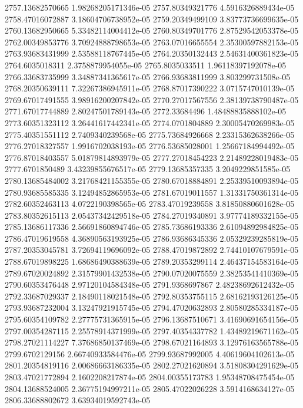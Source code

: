 {2757.13682570665 1.98268205171346e-05
2757.80349321776 4.5916326889434e-05
2758.47016072887 3.18604706738952e-05
2759.20349499109 3.83773736699635e-05
2760.13682950665 5.33482114004412e-05
2760.80349701776 2.87529542053378e-05
2762.00349853776 3.70924888798653e-05
2763.07016655554 2.35300597882153e-05
2763.93683431999 2.53588118767445e-05
2764.20350132443 2.54631400361823e-05
2764.6035018311 2.3758879954055e-05
2765.8035033511 1.96118397192078e-05
2766.33683735999 3.34887341365617e-05
2766.93683811999 3.803299731508e-05
2768.20350639111 7.32267386945911e-05
2768.87017390222 3.0715747010139e-05
2769.67017491555 3.98916200207842e-05
2770.27017567556 2.38139738790487e-05
2771.67017744889 2.80247501789143e-05
2772.33684496 1.48488835888102e-05
2773.60351323112 3.26441617442341e-05
2774.0701804889 2.30005470269983e-05
2775.40351551112 2.7409340239568e-05
2775.73684926668 2.23315362638266e-05
2776.27018327557 1.9916702038193e-05
2776.53685028001 1.25667184994492e-05
2776.87018403557 5.01879814893979e-05
2777.27018454223 2.21489228019483e-05
2777.6701850489 3.43239855676517e-05
2779.13685357335 3.2049229851585e-05
2780.13685484002 3.21768421155355e-05
2780.67018884891 2.25339510093894e-05
2780.93685585335 3.12494852865953e-05
2781.67019011557 1.31331750361314e-05
2782.60352463113 4.0722190398565e-05
2783.47019239558 3.81850880601628e-05
2783.80352615113 2.05437342429518e-05
2784.27019340891 3.97774189332155e-05
2785.13686117336 2.56691860894746e-05
2785.73686193336 2.61094892984825e-05
2786.47019619558 4.36890563193925e-05
2786.93686345336 2.05329239285819e-05
2787.20353045781 3.72694119696092e-05
2788.47019872892 2.74410107679591e-05
2788.67019898225 1.68686490388639e-05
2789.20353299114 2.46437154583164e-05
2789.67020024892 2.31579901432538e-05
2790.07020075559 2.38253541410369e-05
2790.60353476448 2.97120104584348e-05
2791.9368697867 2.48238692612432e-05
2792.33687029337 2.18490118021548e-05
2792.80353755115 2.68162193126125e-05
2793.93687232004 3.13247921915745e-05
2794.47020632893 2.80580285334187e-05
2795.60354109782 2.27775731365915e-05
2796.13687510671 3.41690691654156e-05
2797.00354287115 2.25578914371999e-05
2797.40354337782 1.43489219671162e-05
2798.27021114227 7.37686850137469e-05
2798.67021164893 3.12976163565788e-05
2799.6702129156 2.66740933584476e-05
2799.93687992005 4.40619604102613e-05
2801.20354819116 2.00686663186335e-05
2802.27021620894 3.51808304291629e-05
2803.47021772894 2.1602208217874e-05
2804.00355173783 1.95348708475454e-05
2804.13688524005 2.36775194997211e-05
2805.47022026228 3.5914168634127e-05
2806.33688802672 3.63934019592743e-05
}
